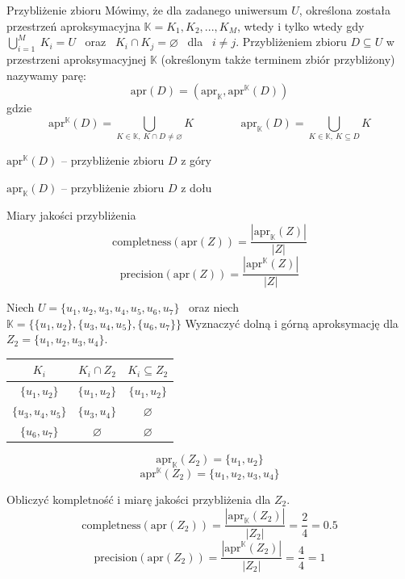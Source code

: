 \documentclass[12pt]{article}
\newcommand{\bbk}{\mathbb{K}}
\begin{document}
\begin{tw}{Przybliżenie zbioru}
    Mówimy, że dla zadanego uniwersum $U$, określona została przestrzeń aproksymacyjna $ \bbk = {K_1, K_2, ..., K_M} $, wtedy i tylko wtedy
    gdy $ \bigcup_{i = 1}^{M} \ K_i = U $ \ oraz \ $ K_i \cap K_j = \varnothing $ \ dla \ $ i \neq j $. Przybliżeniem zbioru $ D \subseteq U $
    w przestrzeni aproksymacyjnej $\bbk$ (określonym także terminem zbiór przybliżony) nazywamy parę:
    \[ \text{apr}(D) = (\text{apr}_{\bbk}, \text{apr}^{\bbk}(D)) \]
    gdzie
    \[ \text{apr}^{\bbk} (D) = \bigcup_{K \in \bbk, \ K \cap D \neq \varnothing } K \hspace{50pt} \text{apr}_{\bbk}(D) = \bigcup_{K \in \bbk, \ K \subseteq D} K \]

    $ \text{apr}^{\bbk}(D) $ -- przybliżenie zbioru $ D $ z góry

    $ \text{apr}_{\bbk}(D) $ -- przybliżenie zbioru $ D $ z dołu
\end{tw}

\begin{tw}{Miary jakości przybliżenia}
    \[ \text{completness}(\text{apr}(Z)) = \frac{ |\text{apr}_{\bbk}(Z)| }{|Z|} \]
    \[ \text{precision}(\text{apr}(Z)) = \frac{ |\text{apr}^{\bbk}(Z)| }{|Z|} \]
\end{tw}

\begin{przyklad}
    Niech $ U = \{u_1, u_2, u_3, u_4, u_5, u_6, u_7\} $ \ oraz niech $\bbk = \{ \{ u_1, u_2 \}, \{ u_3, u_4, u_5 \}, \{ u_6, u_7 \} \}$
    Wyznaczyć dolną i górną aproksymację dla $ Z_2 = \{ u_1, u_2, u_3, u_4 \} $.

    \begin{center}
        \begin{tabular}{c|c|c}
            $ K_i $ & $ K_i \cap Z_2 $ & $ K_i \subseteq Z_2 $ \\
            \hline
            $ \{ u_1, u_2 \} $ & $ \{ u_1, u_2 \} $ & $ \{ u_1, u_2 \} $ \\
            $ \{ u_3, u_4, u_5 \} $ & $ \{ u_3, u_4 \} $ & $ \varnothing $ \\
            $ \{ u_6, u_7 \} $ & $ \varnothing $ & $ \varnothing $ \\
        \end{tabular}
    \end{center}

    \[ \text{apr}_{\bbk}(Z_2) = \{ u_1, u_2 \} \]
    \[ \text{apr}^{\bbk}(Z_2) = \{ u_1, u_2, u_3, u_4 \} \]

    Obliczyć kompletność i miarę jakości przybliżenia dla $Z_2$.
    \[ \text{completness}(\text{apr}(Z_2)) = \frac{ |\text{apr}_{\bbk}(Z_2)| }{|Z_2|} = \frac{2}{4} = 0.5 \]
    \[ \text{precision}(\text{apr}(Z_2)) = \frac{ |\text{apr}^{\bbk}(Z_2)| }{|Z_2|} = \frac{4}{4} = 1 \]
\end{przyklad}
\end{document}
